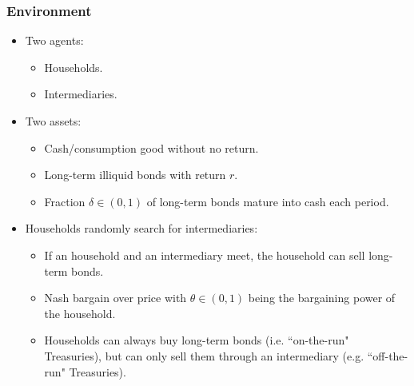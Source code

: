 \documentclass{beamer}
\begin{document}
\begin{frame}
\frametitle{Environment}

\begin{itemize}[<+->]

\item Two agents: 
\begin{itemize}[<+->]

\item Households.
\item Intermediaries.

\end{itemize}

\bigskip

\item Two assets:

\begin{itemize}[<+->]

\item Cash/consumption good without no return.
\item Long-term illiquid bonds with return $r$. 
\item Fraction $\delta \in (0, 1)$ of long-term bonds mature into cash each period. 

\end{itemize}

\bigskip

\item Households randomly search for intermediaries:

\begin{itemize}[<+->]

\item If an household and an intermediary meet, the household can sell long-term bonds.
\item Nash bargain over price with $\theta \in (0, 1)$ being the bargaining power of the household. 
\item Households can always buy long-term bonds (i.e. ``on-the-run" Treasuries), but can only sell them through an intermediary (e.g. ``off-the-run" Treasuries).

\end{itemize}

\end{itemize}

\end{frame}
\end{document}
